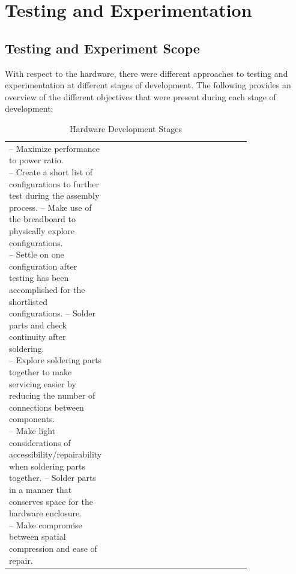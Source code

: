 \section{Testing and Experimentation}\label{sec:testing-and-experimentation}

\subsection{Testing and Experiment Scope}\label{subsec:testing-and-experiment-scope}

With respect to the hardware, there were different approaches
to testing and experimentation
at different stages of development.
The following provides an overview of the different objectives that were present during each stage of development:

\begin{table}[htbp]
      \begin{center}
            \begin{tabular}{|p{0.2\linewidth}|p{0.6\linewidth}|}
                  \hline
                  \tablex{Ideation}{
                        -- Maximize performance to power ratio.\newline
                        -- Create a short list of configurations to further test during the assembly process.
                  }
                  \tablex{Assembly}{
                        -- Make use of the breadboard to physically explore configurations.\newline
                        -- Settle on one configuration after testing has been accomplished for the shortlisted configurations.
                  }
                  \tablex{Prototyping}{
                        -- Solder parts and check continuity after soldering.\newline
                        -- Explore soldering parts together to make servicing easier by reducing the number of connections between components.\newline
                        -- Make light considerations of accessibility/repairability when soldering parts together.
                  }                                                                                                                
                  \tablex{Finalizing}{
                        -- Solder parts in a manner that conserves space for the hardware enclosure.\newline
                        -- Make compromise between spatial compression and ease of repair.
                  }                                                                                                             
            \end{tabular}
      \end{center}
      \caption{Hardware Development Stages}
  \end{table}

